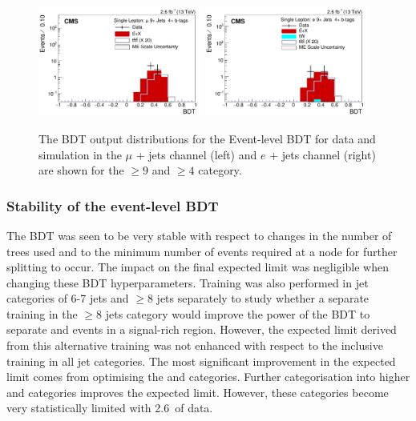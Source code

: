 \begin{figure}[ht!]
    \includegraphics[width=0.48\textwidth]{images/Run2/BDT_Mu29Aug400trees_5MinNodeSize_20nCuts_3MaxDepth_5adaboostbeta_adaBoost_alphaSTune_noMinEvents9nJets4nMtags_StackLogY.pdf}
    \includegraphics[width=0.48\textwidth]{images/Run2/BDT_El29Aug400trees_5MinNodeSize_20nCuts_3MaxDepth_5adaboostbeta_adaBoost_alphaSTune_noMinEvents9nJets4nMtags_StackLogY.pdf}    
    \caption{The BDT output distributions for the Event-level BDT for data and simulation in the $\mu$ + jets channel (left) and $e$ + jets channel (right) are shown for the $\geq9$ \njets and $\geq4$ \nMtags category.}
    \label{fig:BDT_Mu29Aug400trees_5MinNodeSize_20nCuts_3MaxDepth_5adaboostbeta_adaBoost_alphaSTune_noMinEvents94}
\end{figure}

\subsubsection{Stability of the event-level BDT}

The BDT was seen to be very stable with respect to changes in the number of trees used and to the minimum number of events required at a node for further splitting to occur. The impact on the final expected limit was negligible when changing these BDT hyperparameters. Training was also performed in jet categories of 6-7 jets and $\geq$8 jets separately to study whether a separate training in the $\geq8$ jets category would improve the power of the BDT to separate \ttbar and \tttt events in a signal-rich region. However, the expected limit derived from this alternative training was not enhanced with respect to the inclusive training in all jet categories. The most significant improvement in the expected limit comes from optimising the \njets and \nMtags categories. Further categorisation into higher \njets and \nMtags categories improves the expected limit. However, these categories become very statistically limited with 2.6~\fbinv of data.

